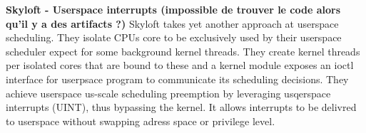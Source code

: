 


\par \textbf{Skyloft - Userspace interrupts (impossible de trouver le code alors qu'il y a des artifacts ?)}  Skyloft takes yet another approach at userspace scheduling. They isolate CPUs core to be exclusively used by their userspace scheduler expect for some background kernel threads. They create kernel threads per isolated cores that are bound to these and a kernel module exposes an ioctl interface for userpsace program to communicate its scheduling decisions. They achieve userspace us-scale scheduling preemption by leveraging usqerspace interrupts (UINT), thus bypassing the kernel. It allows interrupts to be delivred to userspace without swapping adress space or privilege level.\newline

